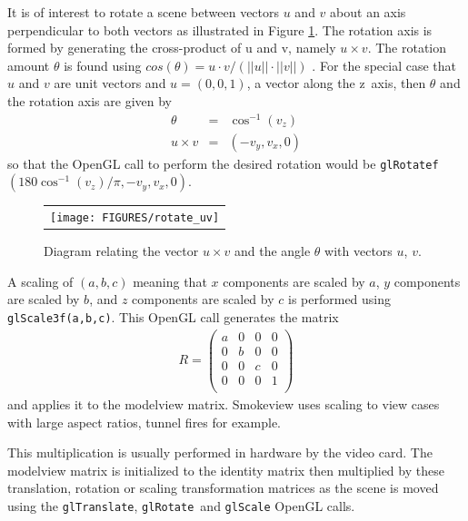 \documentclass[11pt,twoside]{book}
\newcommand{\figoptions}{htp}
\begin{document}
It is of interest to rotate a scene between vectors $u$ and $v$ about an axis perpendicular to both vectors
as illustrated in Figure \ref{figrotateuv}.
The rotation axis is formed by generating the cross-product of u and v, namely $u\times v$.  The
rotation amount $\theta$ is found using $cos(\theta)=u\cdot v/(||u||\cdot ||v||)$ .  For the special case that $u$ and $v$ are unit vectors
and $u=(0,0,1)$, a vector along the z~axis, then $\theta$ and the rotation axis are given by
\begin{eqnarray*}
\theta&=&\cos^{-1}(v_z)\\
u\times v&=&(-v_y,v_x,0)
\end{eqnarray*}
so that the OpenGL call to perform the desired rotation would be {\tt glRotatef}$(180\cos^{-1}(v_z)/\pi,-v_y,v_x,0)$.

\begin{figure}[\figoptions]
\begin{center}
\begin{tabular}{c}
\texttt{[image: FIGURES/rotate\_uv]}
\end{tabular}
\end{center}
\caption{Diagram relating the vector $u\times v$ and the angle $\theta$
with vectors $u$, $v$. }
\label{figrotateuv}
\end{figure}

A scaling of $(a,b,c)$ meaning that
$x$ components are scaled by $a$,
$y$ components are scaled by $b$,
and $z$ components are scaled by $c$
is performed using {\tt glScale3f(a,b,c)}.
This OpenGL call generates the matrix
\begin{eqnarray*}
R=\left(%
\begin{array}{cccc}
  a & 0 & 0 & 0 \\
  0 & b & 0 & 0 \\
  0 & 0 & c & 0 \\
  0 & 0 & 0 & 1 \\
\end{array}%
\right)
\end{eqnarray*}
and applies it to the modelview matrix.
Smokeview uses scaling to
view cases with large aspect ratios, tunnel fires for example.

This multiplication is usually performed in
hardware by the video card.  The modelview matrix is initialized
to the identity matrix then multiplied by these
translation, rotation or scaling transformation matrices as the scene is moved using
the {\tt glTranslate}, {\tt glRotate}\ and {\tt glScale} OpenGL
calls.
\end{document}
